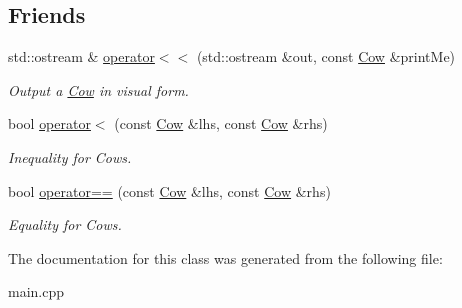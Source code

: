 \subsection*{Friends}
\begin{DoxyCompactItemize}
\item 
\mbox{\label{class_cow_a23e10f6dc9387f62836b1a11290f7432}} 
std\+::ostream \& \hyperlink{class_cow_a23e10f6dc9387f62836b1a11290f7432}{operator$<$$<$} (std\+::ostream \&out, const \hyperlink{class_cow}{Cow} \&print\+Me)
\begin{DoxyCompactList}\small\item\em Output a \hyperlink{class_cow}{Cow} in visual form. \end{DoxyCompactList}\item 
\mbox{\label{class_cow_ad9b4faa3b4ff57053311dfc10dc65bf1}} 
bool \hyperlink{class_cow_ad9b4faa3b4ff57053311dfc10dc65bf1}{operator$<$} (const \hyperlink{class_cow}{Cow} \&lhs, const \hyperlink{class_cow}{Cow} \&rhs)
\begin{DoxyCompactList}\small\item\em Inequality for Cows. \end{DoxyCompactList}\item 
\mbox{\label{class_cow_a03885056798830409b0d982e6e1d5eae}} 
bool \hyperlink{class_cow_a03885056798830409b0d982e6e1d5eae}{operator==} (const \hyperlink{class_cow}{Cow} \&lhs, const \hyperlink{class_cow}{Cow} \&rhs)
\begin{DoxyCompactList}\small\item\em Equality for Cows. \end{DoxyCompactList}\end{DoxyCompactItemize}


The documentation for this class was generated from the following file\+:\begin{DoxyCompactItemize}
\item 
main.\+cpp\end{DoxyCompactItemize}
